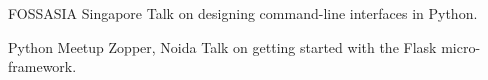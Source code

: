     {FOSSASIA}
    {}
    {Singapore}
    {}
    {
        Talk on designing command-line interfaces in Python.
    }
    \vspace*{0.2\baselineskip}

    {Python Meetup}
    {}
    {Zopper, Noida}
    {}
    {
        Talk on getting started with the Flask micro-framework.
    }
